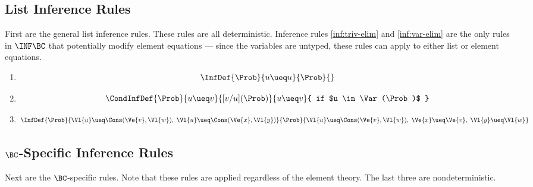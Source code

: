\subsection{List Inference Rules}

First are the general list inference rules. These rules are all deterministic.
Inference rules \ref{inf:triv-elim} and \ref{inf:var-elim} are the only rules
in $\INF\BC$ that potentially modify element equations --- since the variables
are untyped, these rules can apply to either list or element equations.

\begin{enumerate}[(L1), ref=L\arabic*, align=left]
    \item {}
        \[\InfDef
            { \Prob  }{ u \ueq u }
            { \Prob }{}
        \]
    \item {}
        \[\CondInfDef
            {       \Prob  }{ u \ueq v }
            { [v/u](\Prob) }{ u \ueq v }
            { if $u \in \Var(\Prob)$ }
        \]

    \item {}
        \[\InfDef
            { \Prob }{ \Vl{u} \ueq \Cons(\Ve{v}, \Vl{w}), \;
                       \Vl{u} \ueq \Cons(\Ve{x}, \Vl{y}) }
            { \Prob }{ \Vl{u} \ueq \Cons(\Ve{v}, \Vl{w}), \;
                       \Ve{x} \ueq \Ve{v}, \; \Vl{y} \ueq \Vl{w} }
        \]
\end{enumerate}

\subsection{$\BC$-Specific Inference Rules}

Next are the $\BC$-specific rules. Note that these rules are applied regardless
of the element theory. The last three are nondeterministic.

